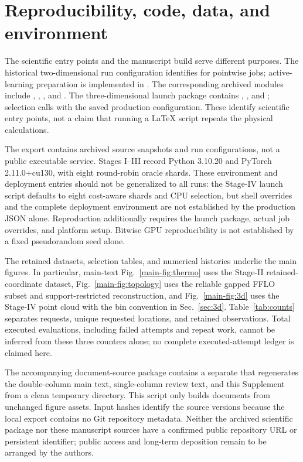 \section{Reproducibility, code, data, and environment}\label{sec:reproduction}
The scientific entry points and the manuscript build serve different purposes. The historical two-dimensional run configuration identifies  for pointwise jobs; active-learning preparation is implemented in . The corresponding archived modules include , , , and . The three-dimensional launch package contains , , and ; selection calls  with the saved production configuration. These identify scientific entry points, not a claim that running a LaTeX script repeats the physical calculations.

The export contains archived source snapshots and run configurations, not a public executable service. Stages I--III record Python 3.10.20 and PyTorch 2.11.0+cu130, with eight round-robin oracle shards. These environment and deployment entries should not be generalized to all runs: the Stage-IV launch script defaults to eight cost-aware shards and CPU selection, but shell overrides and the complete deployment environment are not established by the production JSON alone. Reproduction additionally requires the launch package, actual job overrides, and platform setup. Bitwise GPU reproducibility is not established by a fixed pseudorandom seed alone.

The retained datasets, selection tables, and numerical histories underlie the main figures. In particular, main-text Fig.~\ref{main-fig:thermo} uses the Stage-II retained-coordinate dataset, Fig.~\ref{main-fig:topology} uses the reliable gapped FFLO subset and support-restricted reconstruction, and Fig.~\ref{main-fig:3d} uses the Stage-IV point cloud with the bin convention in Sec.~\ref{sec:3d}. Table~\ref{tab:counts} separates requests, unique requested locations, and retained observations. Total executed evaluations, including failed attempts and repeat work, cannot be inferred from these three counters alone; no complete executed-attempt ledger is claimed here.

The accompanying document-source package contains a separate  that regenerates the double-column main text, single-column review text, and this Supplement from a clean temporary directory. This script only builds documents from unchanged figure assets. Input hashes identify the source versions because the local export contains no Git repository metadata. Neither the archived scientific package nor these manuscript sources have a confirmed public repository URL or persistent identifier; public access and long-term deposition remain to be arranged by the authors.

